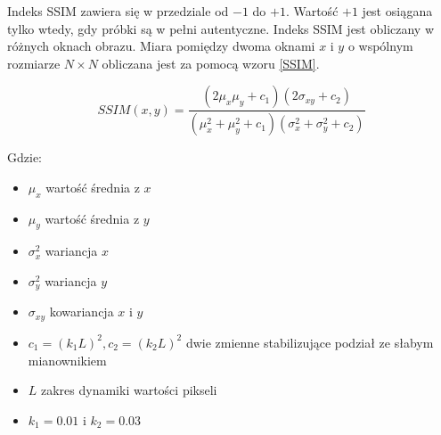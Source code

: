 \documentclass[a4paper,12pt,twoside,openany]{report}
\begin{document}
Indeks SSIM zawiera się w przedziale od $-1$ do $+1$. Wartość $+1$ jest osiągana tylko wtedy, gdy próbki są w pełni autentyczne. Indeks SSIM jest obliczany w różnych oknach obrazu. Miara pomiędzy dwoma oknami $x$ i $y$ o wspólnym rozmiarze $N \times N$ obliczana jest za pomocą wzoru \ref{SSIM}. 

\begin{equation}
	SSIM(x,y)= \frac{(2\mu_x\mu_y+c_1)(2\sigma_{xy}+c_2)}{(\mu_x^2+\mu_y^2+c_1)(\sigma_x^2+\sigma_y^2+c_2)}
	\label{SSIM}
\end{equation}

Gdzie: 
\begin{itemize}
	\item $\mu_x$ wartość średnia z $x$
	\item $\mu_y$ wartość średnia z $y$
	\item $\sigma_x^2$ wariancja $x$
	\item $\sigma_y^2$ wariancja $y$
	\item $\sigma_{xy}$ kowariancja $x$ i $y$
	\item $c_1=(k_1L)^2, c_2=(k_2L)^2$ dwie zmienne stabilizujące podział ze słabym mianownikiem
	\item $L$ zakres dynamiki wartości pikseli 
	\item $k_1=0.01$ i $k_2=0.03$
\end{itemize}





\end{document}
